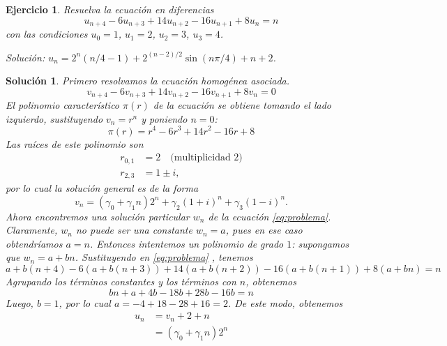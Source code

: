 \documentclass[11pt]{article}
\newtheorem{exercise}{Ejercicio}
\newtheorem*{sol}{Solución}
\begin{document}
\begin{exercise}
  Resuelva la ecuación en diferencias
  \begin{equation}\label{eq:problema}
    u_{n+4} - 6u_{n+3} + 14u_{n+2} - 16 u_{n+1} + 8u_{n} = n
  \end{equation}
  con las condiciones $u_0=1$, $u_1=2$, $u_2=3$, $u_3=4$.

  \emph{Solución: $u_n=2^n(n / 4 -1) + 2^{(n-2) / 2}\sin(n\pi /
  4)+n+2$}.
\end{exercise}
\begin{sol}
  Primero resolvamos la ecuación homogénea asociada.
  \begin{equation}\label{eq:homogeneo}
    v_{n+4} - 6v_{n+3} + 14v_{n+2} - 16 v_{n+1} + 8v_{n} = 0
  \end{equation}
  El polinomio característico $\pi(r)$ de la ecuación
  se obtiene tomando el lado izquierdo, sustituyendo $v_n=r^{n}$ y
  poniendo $n=0$:
  \begin{equation}\label{eq:charpol}
    \pi(r) = r^{4} - 6r^{3} + 14r^{2} - 16 r + 8 
  \end{equation}
  Las raíces de este polinomio son
  \begin{align}
    r_{0,1} &= 2  \quad \text{(multiplicidad $2$)}\\
    r_{2,3} &= 1 \pm i
  ,\end{align}
  por lo cual la solución general es de la forma
  \begin{equation}
    v_n
    = (\gamma_0 + \gamma_1 n) 2^{n}
    + \gamma_2(1+i)^{n}
    + \gamma_3(1-i)^{n}
  .\end{equation}
  Ahora encontremos una solución particular $w_n$ de la ecuación
  \eqref{eq:problema}. Claramente, $w_n$ no puede ser una constante
  $w_n=a$, pues en ese caso obtendríamos $a=n$. Entonces intentemos un
  polinomio de grado $1$: supongamos que $w_n=a+bn$. Sustituyendo en
  \eqref{eq:problema} , tenemos
  \begin{equation}
    a+b(n+4) - 6(a+b(n+3)) + 14(a+b(n+2)) - 16(a+b(n+1)) + 8(a+bn) = n
  \end{equation}
  Agrupando los términos constantes y los términos con $n$, obtenemos
  \begin{equation}
    bn + a+4b -18b +28b -16b = n
  \end{equation}
  Luego, $b=1$, por lo cual $a=-4+18-28+16=2$.
  De este modo, obtenemos
  \begin{align}
    u_n
    &= v_n + 2 + n \\
    &= (\gamma_0 + \gamma_1 n) 2^{n}

\end{align}
\end{sol}
\end{document}
